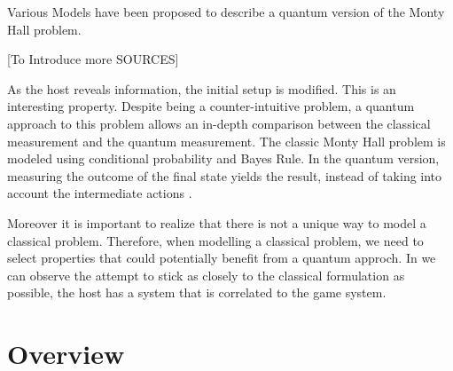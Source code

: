 Various Models have been proposed to describe a quantum version of the Monty Hall problem.

[To Introduce more SOURCES]





As the host reveals information, the initial setup is modified. This is an interesting property. Despite being a counter-intuitive problem, a quantum approach to this problem allows an in-depth comparison between the classical measurement and the quantum measurement. The classic Monty Hall problem is modeled using conditional probability and Bayes Rule. In the quantum version, measuring the outcome of the final state yields the result, instead of taking into account the intermediate actions \cite{Fra2011}.

Moreover it is important to realize that there is not a unique way to model a classical problem\cite{Gill2002}. Therefore, when modelling a classical problem, we need to select properties that could potentially benefit from a quantum approch. In \cite{Gill2002} we can observe the attempt to stick as closely to the classical formulation as possible, the host has a system that is correlated to the game system.


\section{Overview}
\label{sec:related_work_overview}






